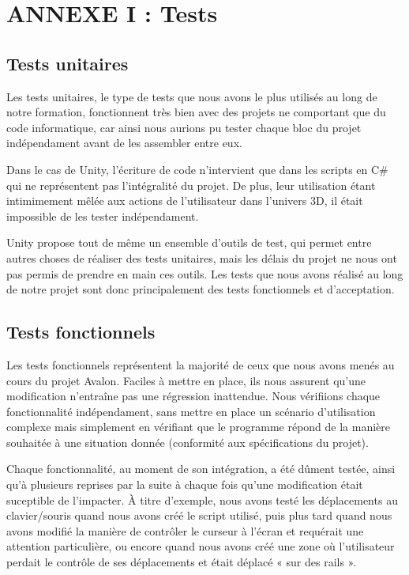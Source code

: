 \section{ANNEXE I : Tests}

\subsection{Tests unitaires}
Les tests unitaires, le type de tests que nous avons le plus utilisés au long de notre formation, fonctionnent très bien avec des projets ne comportant que du code informatique, car ainsi nous aurions pu tester chaque bloc du projet indépendament avant de les assembler entre eux. \newline

Dans le cas de Unity, l'écriture de code n'intervient que dans les scripts en C\# qui ne représentent pas l'intégralité du projet. De plus, leur utilisation étant intimimement mêlée aux actions de l'utilisateur dans l'univers 3D, il était impossible de les tester indépendament. \newline

Unity propose tout de même un ensemble d'outils de test, qui permet entre autres choses de réaliser des tests unitaires, mais les délais du projet ne nous ont pas permis de prendre en main ces outils. Les tests que nous avons réalisé au long de notre projet sont donc principalement des tests fonctionnels et d'acceptation. 

\subsection{Tests fonctionnels}
Les tests fonctionnels représentent la majorité de ceux que nous avons menés au cours du projet Avalon. Faciles à mettre en place, ils nous assurent qu'une modification n'entraîne pas une régression inattendue. Nous vérifiions chaque fonctionnalité indépendament, sans mettre en place un scénario d'utilisation complexe mais simplement en vérifiant que le programme répond de la manière souhaitée à une situation donnée (conformité aux spécifications du projet).\newline

Chaque fonctionnalité, au moment de son intégration, a été dûment testée, ainsi qu'à plusieurs reprises par la suite à chaque fois qu'une modification était suceptible de l'impacter. À titre d'exemple, nous avons testé les déplacements au clavier/souris quand nous avons créé le script utilisé, puis plus tard quand nous avons modifié la manière de contrôler le curseur à l'écran et requérait une attention particulière, ou encore quand nous avons créé une zone où l'utilisateur perdait le contrôle de ses déplacements et était déplacé « sur des rails ».\newline

